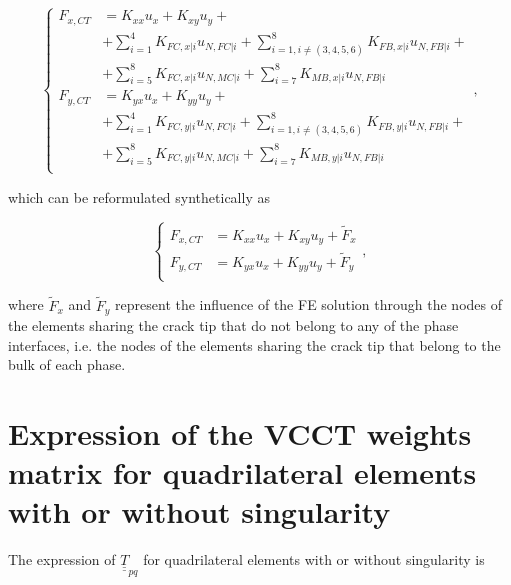 \begin{equation}
\begin{cases}
F_{x,CT}&= K_{xx}u_{x}+K_{xy}u_{y}+\\
&+\sum_{i=1}^{4}K_{FC,x|i}u_{N,FC|i}+\sum_{i=1,i\neq\left(3,4,5,6\right)}^{8}K_{FB,x|i}u_{N,FB|i}+\\
&+\sum_{i=5}^{8}K_{FC,x|i}u_{N,MC|i}+\sum_{i=7}^{8}K_{MB,x|i}u_{N,FB|i}\\
F_{y,CT}&= K_{yx}u_{x}+K_{yy}u_{y}+\\
&+\sum_{i=1}^{4}K_{FC,y|i}u_{N,FC|i}+\sum_{i=1,i\neq\left(3,4,5,6\right)}^{8}K_{FB,y|i}u_{N,FB|i}+\\
&+\sum_{i=5}^{8}K_{FC,y|i}u_{N,MC|i}+\sum_{i=7}^{8}K_{MB,y|i}u_{N,FB|i}\\
\end{cases},
\end{equation}

which can be reformulated synthetically as

\begin{equation}
\begin{cases}
F_{x,CT}&= K_{xx}u_{x}+K_{xy}u_{y}+\widetilde{F}_{x}\\
F_{y,CT}&= K_{yx}u_{x}+K_{yy}u_{y}+\widetilde{F}_{y}\\
\end{cases},
\end{equation}

where $\widetilde{F}_{x}$ and $\widetilde{F}_{y}$ represent the influence of the FE solution through the nodes of the elements sharing the crack tip that do not belong to any of the phase interfaces, i.e. the nodes of the elements sharing the crack tip that belong to the bulk of each phase.

\section{Expression of the VCCT weights matrix for quadrilateral elements with or without singularity}\label{paperA:app:Tpq}

The expression of $\underline{\underline{T}}_{pq}$ for quadrilateral elements with or without singularity is

